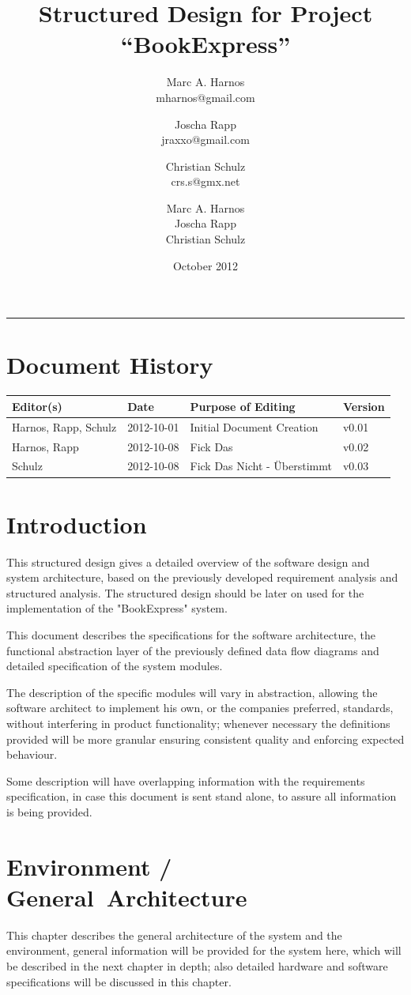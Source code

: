 \documentclass[11pt,a4paper,oneside,svgnames]{report}
\title{Structured Design for Project ``BookExpress''}
\author{Marc A. Harnos\\ {mharnos@gmail.com} \and Joscha Rapp\\ {jraxxo@gmail.com} \and Christian Schulz\\ {crs.s@gmx.net}}
\author{Marc A. Harnos\\ Joscha Rapp\\ Christian Schulz}
\date{October 2012}
\makeatletter
\renewcommand{\maketitle}{\begin{titlepage}%
    \let\footnotesize\small
    \let\footnoterule\relax
    \parindent \z@
    \reset@font
    \null\vfil
    \begin{flushleft}
      \huge \@title
    \end{flushleft}
    \par
    \hrule height 4pt
    \par
    \begin{flushright}
      \LARGE \@author \par
    \end{flushright}
    \vskip 60\p@
    \vfil\null
  \end{titlepage}%
  \setcounter{footnote}{0}%
}
\makeatother
\begin{document}
\maketitle
\tableofcontents

\chapter*{Document History}

\begin{center}

\begin{tabular}{|l|l|l|l|}
\hline 
Editor(s) & Date & Purpose of Editing & Version \\ 
\hline 
Harnos, Rapp, Schulz & 2012-10-01 & Initial Document Creation & v0.01 \\ 
\hline
Harnos, Rapp & 2012-10-08 & Fick Das & v0.02 \\ 
\hline
Schulz & 2012-10-08 & Fick Das Nicht - Überstimmt & v0.03 \\ 
\hline 
\end{tabular} 

\end{center}


\chapter{Introduction}
This structured design gives a detailed overview of the software design and system architecture, based on the previously developed requirement analysis and structured analysis. The structured design should be later on used for the implementation of the "BookExpress" system.

This document describes the specifications for the software architecture, the functional abstraction layer of the previously defined data flow diagrams and detailed specification of the system modules.

The description of the specific modules will vary in abstraction, allowing the software architect to implement his own, or the companies preferred, standards, without interfering in product functionality; whenever necessary the definitions provided will be more granular ensuring consistent quality and enforcing expected behaviour.

Some description will have overlapping information with the requirements specification, in case this document is sent stand alone, to assure all information is being provided.

\chapter{Environment / General~Architecture}
This chapter describes the general architecture of the system and the environment, general information will be provided for the system here, which will be described in the next chapter in depth; also detailed hardware and software specifications will be discussed in this chapter.
\end{document}
